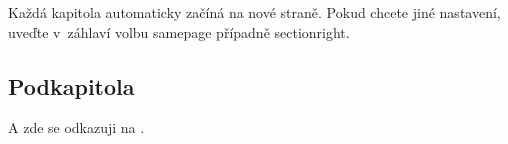 Každá kapitola automaticky začíná na nové straně. Pokud chcete jiné nastavení, uveďte v~záhlaví volbu samepage případně sectionright.
%


\subsection{Podkapitola}
A zde se odkazuji na \cite{Dolan-DeSouza}.